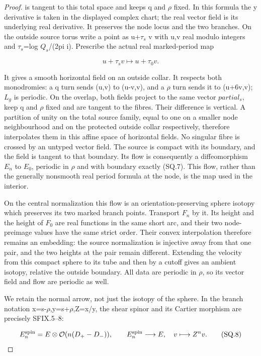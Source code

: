 \begin{proof}
is tangent to this total space and keeps q and \(\rho\) fixed. In this
formula the y derivative is taken in the displayed complex chart;
the real vector field is its underlying real derivative. It preserves
the node locus and the two branches. On the outside source torus
write a point as u+\(\tau_{s}\) v with u,v real modulo integers and
\(\tau_{s}\)=log \(Q_{s}\)/(2pi i). Prescribe the actual real marked-period map

\[
              u+\tau_s v\longmapsto u+\tau_0v.           \tag{SQ.7}
\]

It gives a smooth horizontal field on an outside collar. It respects
both monodromies: a q turn sends (u,v) to (u-v,v), and a \(\rho\) turn
sends it to (u+6v,v); \(L_{g}\) is periodic. On the overlap, both fields
project to the same vector \(partial_{s}\), keep q and \(\rho\) fixed and are
tangent to the fibres. Their difference is vertical. A partition of
unity on the total source family, equal to one on a smaller node
neighbourhood and on the protected outside collar respectively,
therefore interpolates them in this affine space of horizontal
fields. No singular fibre is crossed by an untyped vector field.
The source is compact with its boundary, and the field is tangent to
that boundary. Its flow is consequently a diffeomorphism \(E_{n}\) to \(E_{0}\),
periodic in \(\rho\) and with boundary exactly (SQ.7). This flow, rather
than the generally nonsmooth real period formula at the node, is the
map used in the interior.

On the central normalization this flow is an orientation-preserving
sphere isotopy which preserves its two marked branch points. Transport
\(F_{n}\) by it. Its height and the height of \(F_{0}\) are real functions in the
same short arc, and their two node-preimage values have the same strict
order. Their convex interpolation therefore remains an embedding:
the source normalization is injective away from that one pair, and
the two heights at the pair remain different. Extending the velocity
from this compact sphere to its tube and then by a cutoff gives an
ambient isotopy, relative the outside boundary. All data are periodic
in \(\rho\), so its vector field and flow are periodic as well.

We retain the normal arrow, not just the isotopy of the sphere. In
the branch notation x=s-\(\rho\),y=s+\(\rho\),Z=x/y, the shear spinor and its
Cartier morphism are precisely SFIX.5--8:

\[
 E_n^{\rm spin}=E\otimes\mathcal O(n(D_+-D_-)),\qquad
       E_n^{\rm spin}\longrightarrow E,\quad v\longmapsto Z^n v.
                                                        \tag{SQ.8}
\]


\end{proof}
